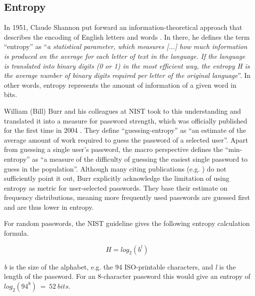 	\subsection{Entropy}
	In 1951, Claude Shannon put forward an information-theoretical approach that describes the encoding of English letters and words \cite{Shannon1951Entropy}. In there, he defines the term ``entropy'' as ``\textit{a statistical parameter, which measures [...] how much information is produced on the average for each letter of text in the language. If the language is translated into binary digits (0 or 1) in the most efficient way, the entropy H is the average number of binary digits required per letter of the original language}''. In other words, entropy represents the amount of information of a given word in bits. 
	
	William (Bill) Burr and his colleagues at NIST took to this understanding and translated it into a measure for password strength, which was officially published for the first time in 2004 \cite[Appendix A]{Burr2004NISTEntropy}. They define ``guessing-entropy'' as ``an estimate of the average amount of work required to guess the password of a selected user''. Apart from guessing a single user's password, the macro perspective defines the ``min-entropy'' as ``a measure of the difficulty of guessing the easiest single password to guess in the population''. Although many citing publications (e.g. \cite{Egelman2013DoesMyPasswordGoUpToEleven,Bonneau2012ScienceOfGuessing}) do not sufficiently point it out, Burr \etal explicitly acknowledge the limitation of using entropy as metric for user-selected passwords. They base their estimate on frequency distributions, meaning more frequently used passwords are guessed first and are thus lower in entropy. 
	
	For random passwords, the NIST guideline gives the following entropy calculation formula. 
	
	$$ H = log_2(b^l)$$
	
	\textit{b} is the size of the alphabet, e.g. the 94 ISO-printable characters, and \textit{l} is the length of the password. For an 8-character password this would give an entropy of $log_2(94^8)~=~52~bits$. 
	
